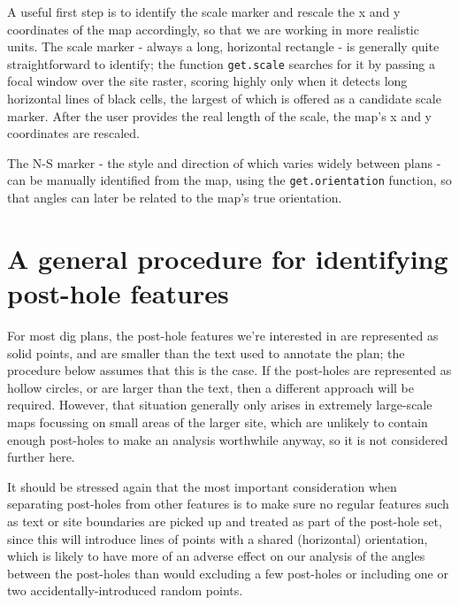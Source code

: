 \documentclass[10pt,fleqn]{article}
\begin{document}
A useful first step is to identify the scale marker and rescale the x and y coordinates of the map accordingly, so that we are working in more realistic units. The scale marker - always a long, horizontal rectangle - is generally quite straightforward to identify; the function \texttt{get.scale} searches for it by passing a focal window over the site raster, scoring highly only when it detects long horizontal lines of black cells, the largest of which is offered as a candidate scale marker. After the user provides the real length of the scale, the map's x and y coordinates are rescaled. %

The N-S marker - the style and direction of which varies widely between plans - can be manually identified from the map, using the \texttt{get.orientation} function, so that angles can later be related to the map's true orientation. 

\section{A general procedure for identifying post-hole features}

For most dig plans, the post-hole features we're interested in are represented as solid points, and are smaller than the text used to annotate the plan; the procedure below assumes that this is the case. If the post-holes are represented as hollow circles, or are larger than the text, then a different approach will be required. However, that situation generally only arises in extremely large-scale maps focussing on small areas of the larger site, which are unlikely to contain enough post-holes to make an analysis worthwhile anyway, so it is not considered further here.

It should be stressed again that the most important consideration when separating post-holes from other features is to make sure no regular features such as text or site boundaries are picked up and treated as part of the post-hole set, since this will introduce lines of points with a shared (horizontal) orientation, which is likely to have more of an adverse effect on our analysis of the angles between the post-holes than would excluding a few post-holes or including one or two accidentally-introduced random points.
\end{document}
